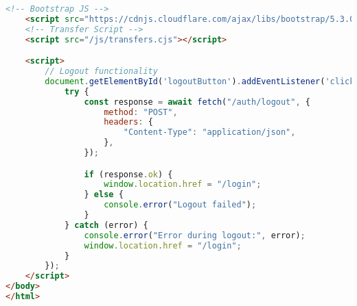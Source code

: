 \begin{lstlisting}[language=HTML]
    <!-- Bootstrap JS -->
    <script src="https://cdnjs.cloudflare.com/ajax/libs/bootstrap/5.3.0/js/bootstrap.bundle.min.js"></script>
    <!-- Transfer Script -->
    <script src="/js/transfers.cjs"></script>

    <script>
        // Logout functionality
        document.getElementById('logoutButton').addEventListener('click', async function() {
            try {
                const response = await fetch("/auth/logout", {
                    method: "POST",
                    headers: {
                        "Content-Type": "application/json",
                    },
                });

                if (response.ok) {
                    window.location.href = "/login";
                } else {
                    console.error("Logout failed");
                }
            } catch (error) {
                console.error("Error during logout:", error);
                window.location.href = "/login";
            }
        });
    </script>
</body>
</html>
\end{lstlisting}
